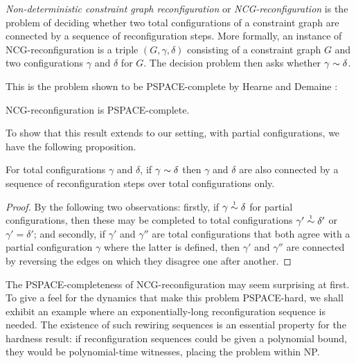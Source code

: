 \documentclass{lmcs}
\let\capsabbrev=\uppercase
\begin{document}
\emph{Non-deterministic constraint graph reconfiguration} or \emph{\capsabbrev{ncg}-reconfiguration} is the problem of deciding whether two total configurations of a constraint graph are connected by a sequence of reconfiguration steps. More formally, an instance of \capsabbrev{ncg}-reconfiguration is a triple $(G,\gamma,\delta)$ consisting of a constraint graph $G$ and two configurations $\gamma$ and $\delta$ for $G$. The decision problem then asks whether $\gamma\perm\delta$.

This is the problem shown to be \capsabbrev{pspace}-complete by Hearne and Demaine \cite{GamesPuzzlesAndComputation}:

\begin{theorem}
\capsabbrev{ncg}-reconfiguration is \capsabbrev{pspace}-complete.
\end{theorem}

To show that this result extends to our setting, with partial configurations, we have the following proposition.

\begin{proposition}
\label{prop:partial simulates total reconfiguration}
For total configurations $\gamma$ and $\delta$, if $\gamma\perm\delta$ then $\gamma$ and $\delta$ are also connected by a sequence of reconfiguration steps over total configurations only.
\end{proposition}

\begin{proof}
By the following two observations: firstly, 
%
if $\gamma\perm*\delta$ for partial configurations, then these may be completed to total configurations $\gamma'\perm*\delta'$ or $\gamma'=\delta'$; and secondly,
%
if $\gamma'$ and $\gamma''$ are total configurations that both agree with a partial configuration $\gamma$ where the latter is defined, then $\gamma'$ and $\gamma''$ are connected by reversing the edges on which they disagree one after another.
%
\end{proof}

The \capsabbrev{pspace}-completeness of \capsabbrev{ncg}-reconfiguration may seem surprising at first. To give a feel for the dynamics that make this problem \capsabbrev{pspace}-hard, we shall exhibit an example where an exponentially-long reconfiguration sequence is needed. The existence of such rewiring sequences is an essential property for the hardness result: if reconfiguration sequences could be given a polynomial bound, they would be polynomial-time witnesses, placing the problem within NP.
\end{document}
